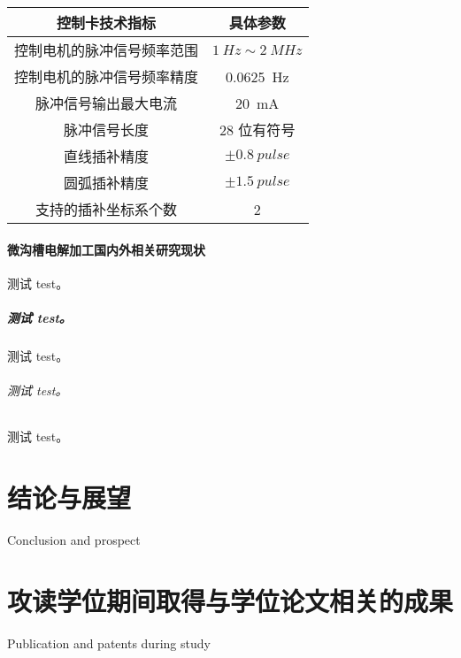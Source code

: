 \documentclass[
  type=master
]{gdutthesis}
\begin{document}
\begin{table}
  \label{tab:example}
  \begin{tabular}{cc}
    \toprule
    控制卡技术指标              & 具体参数                      \\
    \midrule
    控制电机的脉冲信号频率范围  & $\SI{1}{Hz}\sim\SI{2}{MHz}$ \\
    控制电机的脉冲信号频率精度  & \SI{0.0625}{Hz}              \\
    脉冲信号输出最大电流        & \SI{20}{mA}                  \\
    脉冲信号长度                & 28 位有符号                   \\
    直线插补精度                & $\pm \SI{0.8}{pulse}$        \\
    圆弧插补精度                & $\pm \SI{1.5}{pulse}$        \\
    支持的插补坐标系个数        & 2                             \\
    \bottomrule
  \end{tabular}
\end{table}


\subsubsection{微沟槽电解加工国内外相关研究现状}
测试 test。
\paragraph{测试 test。}
测试 test。
\subparagraph{测试 test。}
测试 test。

\gdutbackmatter
\chapter{结论与展望}{Conclusion and prospect}
\zhlipsum[1]

\zhlipsum[1]

\nocite{*}%
\printbibliography

\chapter{攻读学位期间取得与学位论文相关的成果}{Publication and patents during study}

\end{document}
